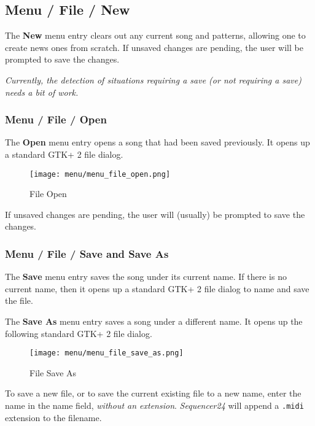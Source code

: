 \subsection{Menu / File / New}
\label{subsec:menu_file_new}

   The \textbf{New} menu entry clears out any current song and patterns,
   allowing one to create news ones from scratch.
   If unsaved changes are pending, the user will be prompted to save the
   changes.

   \textsl{Currently, the detection of situations requiring a save (or not
   requiring a save) needs a bit of work.}

\subsubsection{Menu / File / Open}
\label{subsubsec:seq24_menu_file_open}

   The \textbf{Open} menu entry opens a song that had been saved previously.
   It opens up a standard GTK+ 2 file dialog.

\begin{figure}[H]
   \centering 
   \texttt{[image: menu/menu\_file\_open.png]}
   \caption{File Open}
   \label{fig:seq24_menu_file_open}
\end{figure}

   If unsaved changes are pending, the user will (usually)
   be prompted to save the changes.

\subsubsection{Menu / File / Save and Save As}
\label{subsubsec:menu_file_open_save_as}

   The \textbf{Save} menu entry saves the song under its current name.
   If there is no current name, then
   it opens up a standard GTK+ 2 file dialog to name and save the file.

   The \textbf{Save As} menu entry saves a song under a different name.
   It opens up the following standard GTK+ 2 file dialog.

\begin{figure}[H]
   \centering 
   \texttt{[image: menu/menu\_file\_save\_as.png]}
   \caption{File Save As}
   \label{fig:seq24_menu_file_save_as}
\end{figure}

   To save a new file, or to save the current existing file to a new name,
   enter the name in the name field, \textsl{without an extension}.
   \textsl{Sequencer24} will append a \texttt{.midi} extension to the filename.

